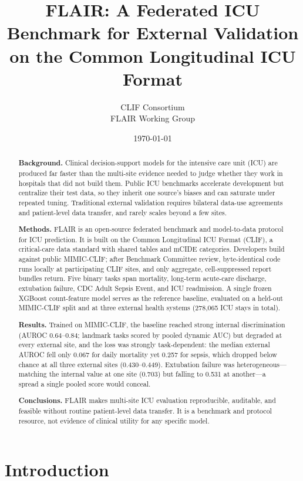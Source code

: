 \documentclass[12pt]{article}
\title{\textbf{FLAIR: A Federated ICU Benchmark for External Validation on the Common Longitudinal ICU Format}}
\author{CLIF Consortium \\ FLAIR Working Group}
\date{\today}
\begin{document}
\maketitle

\begin{abstract}
\noindent\textbf{Background.} Clinical decision-support models for the intensive care unit (ICU) are produced far faster than the multi-site evidence needed to judge whether they work in hospitals that did not build them. Public ICU benchmarks accelerate development but centralize their test data, so they inherit one source's biases and can saturate under repeated tuning. Traditional external validation requires bilateral data-use agreements and patient-level data transfer, and rarely scales beyond a few sites.

\noindent\textbf{Methods.} FLAIR is an open-source federated benchmark and model-to-data protocol for ICU prediction. It is built on the Common Longitudinal ICU Format (CLIF), a critical-care data standard with shared tables and mCIDE categories. Developers build against public MIMIC-CLIF; after Benchmark Committee review, byte-identical code runs locally at participating CLIF sites, and only aggregate, cell-suppressed report bundles return. Five binary tasks span mortality, long-term acute-care discharge, extubation failure, CDC Adult Sepsis Event, and ICU readmission. A single frozen XGBoost count-feature model serves as the reference baseline, evaluated on a held-out MIMIC-CLIF split and at three external health systems (278{,}065 ICU stays in total).

\noindent\textbf{Results.} Trained on MIMIC-CLIF, the baseline reached strong internal discrimination (AUROC 0.64--0.84; landmark tasks scored by pooled dynamic AUC) but degraded at every external site, and the loss was strongly task-dependent: the median external AUROC fell only 0.067 for daily mortality yet 0.257 for sepsis, which dropped below chance at all three external sites (0.430--0.449). Extubation failure was heterogeneous---matching the internal value at one site (0.703) but falling to 0.531 at another---a spread a single pooled score would conceal.

\noindent\textbf{Conclusions.} FLAIR makes multi-site ICU evaluation reproducible, auditable, and feasible without routine patient-level data transfer. It is a benchmark and protocol resource, not evidence of clinical utility for any specific model.
\end{abstract}

\section{Introduction}
\end{document}
